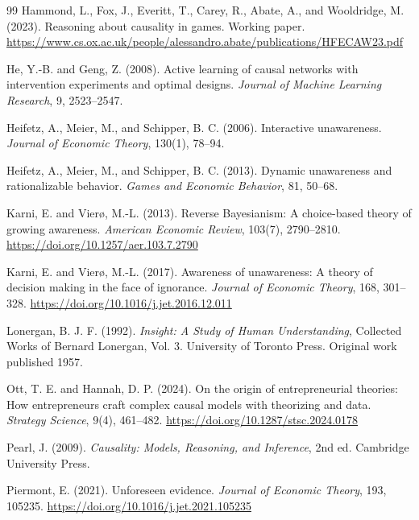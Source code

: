 \documentclass[11pt]{article}
\begin{document}
\begin{thebibliography}{99}
		Hammond, L., Fox, J., Everitt, T., Carey, R., Abate, A., and Wooldridge, M. (2023).
		Reasoning about causality in games.
		Working paper.
		\url{https://www.cs.ox.ac.uk/people/alessandro.abate/publications/HFECAW23.pdf}
		
		He, Y.-B. and Geng, Z. (2008).
		Active learning of causal networks with intervention experiments and optimal designs.
		\emph{Journal of Machine Learning Research}, 9, 2523--2547.
		
		Heifetz, A., Meier, M., and Schipper, B. C. (2006).
		Interactive unawareness.
		\emph{Journal of Economic Theory}, 130(1), 78--94.
		
		Heifetz, A., Meier, M., and Schipper, B. C. (2013).
		Dynamic unawareness and rationalizable behavior.
		\emph{Games and Economic Behavior}, 81, 50--68.
		
		Karni, E. and Vier\o, M.-L. (2013).
		Reverse Bayesianism: A choice-based theory of growing awareness.
		\emph{American Economic Review}, 103(7), 2790--2810.
		\url{https://doi.org/10.1257/aer.103.7.2790}
		
		Karni, E. and Vier\o, M.-L. (2017).
		Awareness of unawareness: A theory of decision making in the face of ignorance.
		\emph{Journal of Economic Theory}, 168, 301--328.
		\url{https://doi.org/10.1016/j.jet.2016.12.011}
		
		Lonergan, B. J. F. (1992).
		\emph{Insight: A Study of Human Understanding}, Collected Works of Bernard Lonergan, Vol. 3.
		University of Toronto Press.  Original work published 1957.
		
		Ott, T. E. and Hannah, D. P. (2024).
		On the origin of entrepreneurial theories: How entrepreneurs craft complex causal models with theorizing and data.
		\emph{Strategy Science}, 9(4), 461--482.
		\url{https://doi.org/10.1287/stsc.2024.0178}
		
		Pearl, J. (2009).
		\emph{Causality: Models, Reasoning, and Inference}, 2nd ed.
		Cambridge University Press.
		
		Piermont, E. (2021).
		Unforeseen evidence.
		\emph{Journal of Economic Theory}, 193, 105235.
		\url{https://doi.org/10.1016/j.jet.2021.105235}
		

\end{thebibliography}
\end{document}
